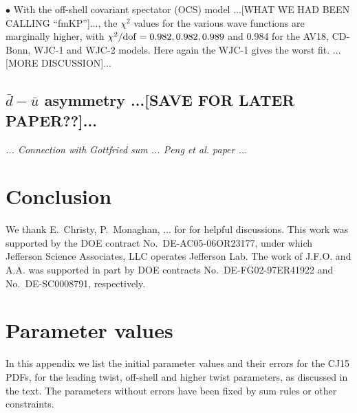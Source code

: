 \documentclass[aps,prd,amsmath,preprint]{revtex4}
\begin{document}
$\bullet$
With the off-shell covariant spectator (OCS) model
...[WHAT WE HAD BEEN CALLING ``fmKP'']...,
the $\chi^2$ values for the various wave functions are marginally higher,
with $\chi^2/{\rm dof} = 0.982, 0.982, 0.989$ and 0.984 for the
AV18, CD-Bonn, WJC-1 and WJC-2 models.  Here again the WJC-1 gives
the worst fit.
...[MORE DISCUSSION]...


\subsection{$\bar d - \bar u$ asymmetry
	...[SAVE FOR LATER PAPER??]...}
\label{ssec:dubar}

{\it
... Connection with Gottfried sum ... Peng et al. paper ...
}



\section{Conclusion}
\label{sec:conclusion}



\acknowledgments

We thank E.~Christy, P.~Monaghan, ... for for helpful discussions.
This work was supported by the DOE contract No.~DE-AC05-06OR23177,
under which Jefferson Science Associates, LLC operates Jefferson Lab.
The work of J.F.O. and A.A. was supported in part by DOE contracts
No.~DE-FG02-97ER41922 and No.~DE-SC0008791, respectively.


\newpage
\appendix
\section{Parameter values}
\label{app:param}

In this appendix we list the initial parameter values and their errors
for the CJ15 PDFs, for the leading twist, off-shell and higher twist
parameters, as discussed in the text.  The parameters without errors
have been fixed by sum rules or other constraints.
\end{document}
